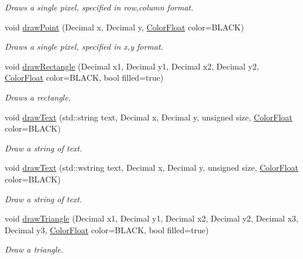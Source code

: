 \begin{DoxyCompactItemize}
\begin{DoxyCompactList}\small\item\em Draws a single pixel, specified in row,column format. \end{DoxyCompactList}\item 
void \hyperlink{classtsgl_1_1_cartesian_canvas_a2ef932501dd03f885fd0ff30ddffae01}{draw\+Point} (Decimal x, Decimal y, \hyperlink{structtsgl_1_1_color_float}{Color\+Float} color=B\+L\+A\+C\+K)
\begin{DoxyCompactList}\small\item\em Draws a single pixel, specified in x,y format. \end{DoxyCompactList}\item 
void \hyperlink{classtsgl_1_1_cartesian_canvas_a5e88e7d751e24ae78d158f1d8e9faf5e}{draw\+Rectangle} (Decimal x1, Decimal y1, Decimal x2, Decimal y2, \hyperlink{structtsgl_1_1_color_float}{Color\+Float} color=B\+L\+A\+C\+K, bool filled=true)
\begin{DoxyCompactList}\small\item\em Draws a rectangle. \end{DoxyCompactList}\item 
void \hyperlink{classtsgl_1_1_cartesian_canvas_a7df01e80ce99d0ce6b45532034c0940c}{draw\+Text} (std\+::string text, Decimal x, Decimal y, unsigned size, \hyperlink{structtsgl_1_1_color_float}{Color\+Float} color=B\+L\+A\+C\+K)
\begin{DoxyCompactList}\small\item\em Draw a string of text. \end{DoxyCompactList}\item 
void \hyperlink{classtsgl_1_1_cartesian_canvas_addacb4d3637bf2674e2a992a0c165160}{draw\+Text} (std\+::wstring text, Decimal x, Decimal y, unsigned size, \hyperlink{structtsgl_1_1_color_float}{Color\+Float} color=B\+L\+A\+C\+K)
\begin{DoxyCompactList}\small\item\em Draw a string of text. \end{DoxyCompactList}\item 
void \hyperlink{classtsgl_1_1_cartesian_canvas_a67c225592f9416de476943bb93309cd1}{draw\+Triangle} (Decimal x1, Decimal y1, Decimal x2, Decimal y2, Decimal x3, Decimal y3, \hyperlink{structtsgl_1_1_color_float}{Color\+Float} color=B\+L\+A\+C\+K, bool filled=true)
\begin{DoxyCompactList}\small\item\em Draw a triangle. \end{DoxyCompactList}\item 

\end{DoxyCompactItemize}
